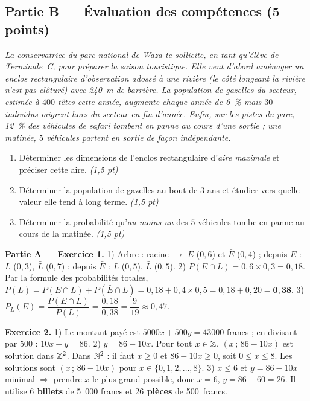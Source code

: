 \subsection*{Partie B — Évaluation des compétences \hfill (5 points)}

\noindent\textit{La conservatrice du parc national de Waza te sollicite, en tant
qu'élève de Terminale~C, pour préparer la saison touristique. Elle veut d'abord
aménager un enclos rectangulaire d'observation \emph{adossé à une rivière} (le côté
longeant la rivière n'est pas clôturé) avec \SI{240}{\metre} de barrière. La
population de gazelles du secteur, estimée à $400$ têtes cette année, augmente
chaque année de \SI{6}{\percent} mais $30$ individus migrent hors du secteur en fin
d'année. Enfin, sur les pistes du parc, \SI{12}{\percent} des véhicules de safari
tombent en panne au cours d'une sortie ; une matinée, $5$ véhicules partent en
sortie de façon indépendante.}

\begin{enumerate}[label=\textbf{Tâche \arabic*.},leftmargin=2.4em]
\item Déterminer les dimensions de l'enclos rectangulaire d'\emph{aire maximale} et
préciser cette aire. \hfill\textit{(1,5 pt)}
\item Déterminer la population de gazelles au bout de $3$ ans et étudier vers
quelle valeur elle tend à long terme. \hfill\textit{(1,5 pt)}
\item Déterminer la probabilité qu'\emph{au moins un} des $5$ véhicules tombe en
panne au cours de la matinée. \hfill\textit{(1,5 pt)}
\end{enumerate}
\par{}


\noindent\textbf{Partie A — Exercice 1.}
1) Arbre : racine $\to$ $E$ ($0{,}6$) et $\bar E$ ($0{,}4$) ; depuis $E$ : $L$
($0{,}3$), $\bar L$ ($0{,}7$) ; depuis $\bar E$ : $L$ ($0{,}5$), $\bar L$
($0{,}5$).
2) $P(E\cap L)=0{,}6\times0{,}3=0{,}18$. Par la formule des probabilités totales,
$P(L)=P(E\cap L)+P(\bar E\cap L)=0{,}18+0{,}4\times0{,}5=0{,}18+0{,}20=\mathbf{0{,}38}$.
3) $P_L(E)=\dfrac{P(E\cap L)}{P(L)}=\dfrac{0{,}18}{0{,}38}=\dfrac{9}{19}\approx0{,}47$.

\noindent\textbf{Exercice 2.}
1) Le montant payé est $5000x+500y=43000$ francs ; en divisant par $500$ :
$10x+y=86$.
2) $y=86-10x$. Pour tout $x\in\mathbb{Z}$, $(x\,;\,86-10x)$ est solution dans $\mathbb{Z}^2$.
Dans $\mathbb{N}^2$ : il faut $x\ge0$ et $86-10x\ge0$, soit $0\le x\le8$. Les solutions
sont $(x\,;\,86-10x)$ pour $x\in\{0,1,2,\dots,8\}$.
3) $x\le6$ et $y=86-10x$ minimal $\Rightarrow$ prendre $x$ le plus grand possible,
donc $x=6$, $y=86-60=26$. Il utilise \textbf{$6$ billets} de \SI{5}{000} francs et
\textbf{$26$ pièces} de \SI{500} francs.

